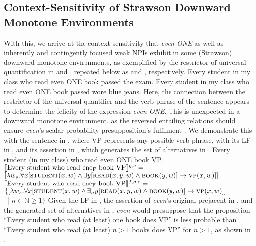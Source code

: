 \subsection{Context-Sensitivity of Strawson Downward Monotone Environments}
With this, we arrive at the context-sensitivity that \textit{even ONE} as well as inherently and contingently focused weak NPIs exhibit in some (Strawson) downward monotone environments, as exemplified by the restrictor of universal quantification in  and , repeated below as  and , respectively.
\pex
\a Every student in my class who read even \MakeUppercase{one} book passed the exam.
\a\ljudge{\#}Every student in my class who read even \MakeUppercase{one} book passed wore blue jeans.
\xe
Here, the connection between the restrictor of the universal quantifier and the verb phrase of the sentence appears to determine the felicity of the expression \textit{even \MakeUppercase{one}}. This is unexpected in a downward monotone environment, as the reversed entailing relations should ensure \textit{even}'s scalar probability presupposition's fulfilment \parencite{Crnic2014-dogma,Crnic2014-nm}. We demonstrate this with the sentence in , where VP represents any possible verb phrase, with its LF in , and its assertion in , which generates the set of alternatives in .
\pex\label{ex:even-sdm-demo}
\a Every student (in my class) who read even \MakeUppercase{one} book VP.
\a[] [even\textsubscript{C} [every student who read one\textsubscript{F} book VP]]
\a $\intension[g,c]{Every student who read one\textsubscript{F} book VP}=$\\\emptyfill$[\lambda{w_s}.\forall{x}[\predicate{student}(x,w)\land\exists{y}[\predicate{read}(x,y,w)\land\predicate{book}(y,w)]\rightarrow\predicate{vp}(x,w)]]$
\a $\intension[f,g,c]{Every student who read one\textsubscript{F} book VP}=$\\$\{[\lambda{w_s}.\forall{x}[\predicate{student}(x,w)\land\exists_n{y}[\predicate{read}(x,y,w)\land\predicate{book}(y,w)]\rightarrow\predicate{vp}(x,w)]]$\\\emptyfill~| $n\in\mathbb{N}\geqslant1\}$
\xe
Given the LF in , the assertion of \textit{even}'s original prejacent in , and the generated set of alternatives in , \textit{even} would presuppose that the proposition  \enquote{Every student who read (at least) one book does VP} is less probable than \enquote{Every student who read (at least) $n>1$ books does VP} for $n>1$, as shown in .
